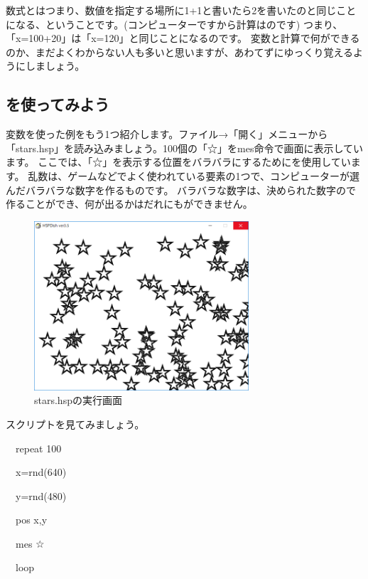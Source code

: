 数式とはつまり、数値を指定する場所に1+1と書いたら2を書いたのと同じことになる、ということです。(コンピューターですから計算はのです)
つまり、「x=100+20」は「x=120」と同じことになるのです。
変数と計算で何ができるのか、まだよくわからない人も多いと思いますが、あわてずにゆっくり覚えるようにしましょう。

\subsection{を使ってみよう}

変数を使った例をもう1つ紹介します。ファイル→「開く」メニューから「stars.hsp」を読み込みましょう。100個の「☆」をmes命令で画面に表示しています。
ここでは、「☆」を表示する位置をバラバラにするためにを使用しています。
乱数は、ゲームなどでよく使われている要素の1つで、コンピューターが選んだバラバラな数字を作るものです。
バラバラな数字は、決められた数字ので作ることができ、何が出るかはだれにもができません。

\begin{figure}[H]
    \begin{center}
        \includegraphics[keepaspectratio,width=7.99cm,height=6.297cm]{text02-img/text02-img047.png}
        \caption{stars.hspの実行画面}
    \end{center}
\end{figure}

スクリプトを見てみましょう。

\begin{description}
    \item \ \ repeat 100
    \item \ \ x=rnd(640)
    \item \ \ y=rnd(480)
    \item \ \ pos x,y
    \item \ \ mes {\textquotedbl}☆{\textquotedbl}
    \item \ \ loop
\end{description}

